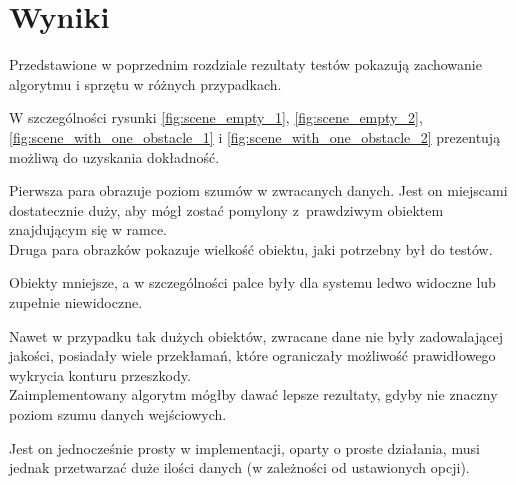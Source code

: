 \chapter{Wyniki}\label{ch:results}

Przedstawione w poprzednim rozdziale rezultaty testów pokazują zachowanie algorytmu i sprzętu w różnych przypadkach.

W szczególności rysunki \ref{fig:scene_empty_1}, \ref{fig:scene_empty_2}, \ref{fig:scene_with_one_obstacle_1} i \ref{fig:scene_with_one_obstacle_2} prezentują możliwą do uzyskania dokładność.

Pierwsza para obrazuje poziom szumów w zwracanych danych.
Jest on miejscami dostatecznie duży, aby mógł zostać pomylony z~prawdziwym obiektem znajdującym się w ramce.\\

Druga para obrazków pokazuje wielkość obiektu, jaki potrzebny był do testów.

Obiekty mniejsze, a w szczególności palce były dla systemu ledwo widoczne lub zupełnie niewidoczne.

Nawet w przypadku tak dużych obiektów, zwracane dane nie były zadowalającej jakości, posiadały wiele przekłamań, które ograniczały możliwość prawidłowego wykrycia konturu przeszkody.\\

Zaimplementowany algorytm mógłby dawać lepsze rezultaty, gdyby nie znaczny poziom szumu danych wejściowych.

Jest on jednocześnie prosty w implementacji, oparty o proste działania, musi jednak przetwarzać duże ilości danych (w zależności od ustawionych opcji).
